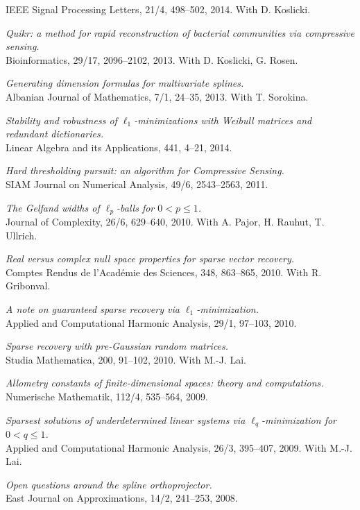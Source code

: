 \documentclass[11pt]{article}
\begin{document}
IEEE Signal Processing Letters, 21/4, 498--502, 2014. 
With D. Koslicki.
\item {\sl Quikr: a method for rapid reconstruction of bacterial communities via compressive sensing.}\\
Bioinformatics, 29/17, 2096--2102, 2013. 
With D. Koslicki, G. Rosen.
\item {\sl Generating dimension formulas for multivariate splines.}\\
Albanian Journal of Mathematics, 7/1, 24--35, 2013.
 With T. Sorokina.
\item {\sl Stability and robustness of $\ell_1$-minimizations with Weibull matrices and redundant dictionaries.}\\
Linear Algebra and its Applications, 441, 4--21, 2014.
\item {\sl Hard thresholding pursuit: an algorithm for Compressive Sensing.}\\
SIAM Journal on Numerical Analysis, 49/6, 2543--2563, 2011.
\item {\sl The Gelfand widths of $\ell_p$-balls for $0<p \le 1$.}\\
Journal of Complexity, 26/6, 629--640, 2010. 
With A. Pajor, H. Rauhut, T. Ullrich.
\item {\sl Real versus complex null space properties for sparse vector recovery.}\\
Comptes Rendus de l'Acad\'emie des Sciences, 348, 863--865, 2010. 
With R. Gribonval.
\item {\sl A note on guaranteed sparse recovery via $\ell_1$-minimization.}\\
Applied and Computational Harmonic Analysis, 29/1, 97--103, 2010.
\item {\sl Sparse recovery with pre-Gaussian random matrices.}\\
Studia Mathematica, 200, 91--102, 2010. 
With M.-J. Lai.
\item {\sl Allometry constants of finite-dimensional spaces: theory and computations.}\\
Numerische Mathematik,  112/4, 535--564, 2009.
\item {\sl  Sparsest solutions of underdetermined linear systems via $\ell_q$-minimization for $0 <  q  \le  1$.}\\
Applied and Computational Harmonic Analysis, 26/3, 395--407, 2009. 
With M.-J. Lai.
\item {\sl Open questions around the spline orthoprojector.}\\
East Journal on Approximations, 14/2, 241--253, 2008.
\end{document}
